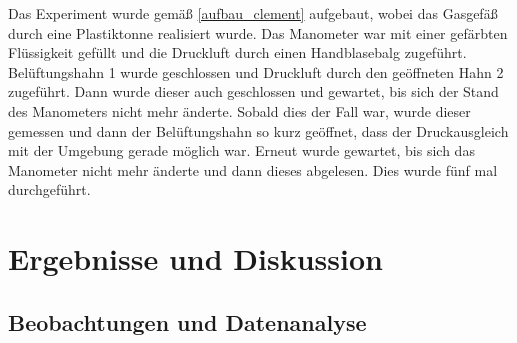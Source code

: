 \documentclass[
	a4paper,
	12pt,
	pagesize,
	ngerman
]{scrartcl}
\begin{document}
	Das Experiment wurde gemäß \cref{aufbau_clement} aufgebaut, wobei das Gasgefäß durch eine Plastiktonne realisiert wurde.
	Das Manometer war mit einer gefärbten Flüssigkeit gefüllt und die Druckluft durch einen Handblasebalg zugeführt.
	Belüftungshahn 1 wurde geschlossen und Druckluft durch den geöffneten Hahn 2 zugeführt.
	Dann wurde dieser auch geschlossen und gewartet, bis sich der Stand des Manometers nicht mehr änderte.
	Sobald dies der Fall war, wurde dieser gemessen und dann der Belüftungshahn so kurz geöffnet, dass der Druckausgleich mit der Umgebung gerade möglich war.
	Erneut wurde gewartet, bis sich das Manometer nicht mehr änderte und dann dieses abgelesen.
	Dies wurde fünf mal durchgeführt.
	
	\section{Ergebnisse und Diskussion}
	

	\subsection{Beobachtungen und Datenanalyse}
\end{document}
